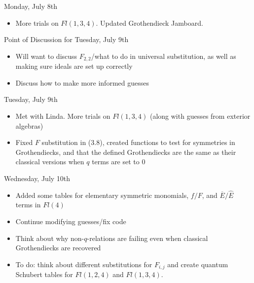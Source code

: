Monday, July 8th
\begin{itemize}
    \item More trials on $Fl(1, 3, 4)$. Updated Grothendieck Jamboard.
\end{itemize}

Point of Discussion for Tuesday, July 9th
\begin{itemize}
    \item Will want to discuss $F_{2, 2}$/what to do in universal substitution, as well as making sure ideals are set up correctly
    \item Discuss how to make more informed guesses
\end{itemize}

Tuesday, July 9th
\begin{itemize}
    \item Met with Linda. More trials on $Fl(1, 3, 4)$ (along with guesses from exterior algebras)
    \item Fixed $F$ substitution in (3.8), created functions to test for symmetries in Grothendiecks, and that the defined Grothendiecks are the same as their classical versions when $q$ terms are set to $0$
\end{itemize}

Wednesday, July 10th
\begin{itemize}
    \item Added some tables for elementary symmetric monomials, $f/F$, and $\overline{E}/\hat{E}$ terms in $Fl(4)$
    \item Continue modifying guesses/fix code
    \item Think about why non-$q$-relations are failing even when classical Grothendiecks are recovered
    \item To do: think about different substitutions for $F_{i, j}$ and create quantum Schubert tables for $Fl(1, 2, 4)$ and $Fl(1, 3, 4)$.
    
\end{itemize}